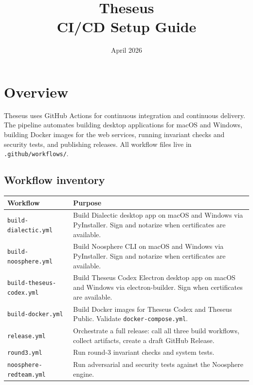 \documentclass[11pt,letterpaper]{article}
\title{\textbf{Theseus}\\[4pt]\large CI/CD Setup Guide}
\date{April 2026}
\author{}
\newcommand{\file}[1]{\texttt{#1}}
\begin{document}
\maketitle
\thispagestyle{empty}

\tableofcontents
\newpage

\section{Overview}

Theseus uses GitHub Actions for continuous integration and continuous delivery. The pipeline automates building desktop applications for macOS and Windows, building Docker images for the web services, running invariant checks and security tests, and publishing releases. All workflow files live in \file{.github/workflows/}.

\subsection{Workflow inventory}

\begin{longtable}{p{4.2cm} p{10.3cm}}
\toprule
\textbf{Workflow} & \textbf{Purpose} \\
\midrule
\endhead
\file{build-dialectic.yml}        & Build Dialectic desktop app on macOS and Windows via PyInstaller. Sign and notarize when certificates are available. \\
\file{build-noosphere.yml}        & Build Noosphere CLI on macOS and Windows via PyInstaller. Sign and notarize when certificates are available. \\
\file{build-theseus-codex.yml}   & Build Theseus Codex Electron desktop app on macOS and Windows via electron-builder. Sign when certificates are available. \\
\file{build-docker.yml}           & Build Docker images for Theseus Codex and Theseus Public. Validate \file{docker-compose.yml}. \\
\file{release.yml}                & Orchestrate a full release: call all three build workflows, collect artifacts, create a draft GitHub Release. \\
\file{round3.yml}                 & Run round-3 invariant checks and system tests. \\
\file{noosphere-redteam.yml}      & Run adversarial and security tests against the Noosphere engine. \\
\bottomrule
\end{longtable}
\end{document}

